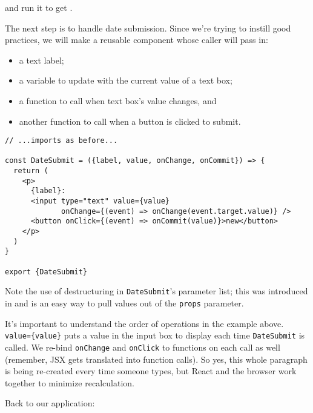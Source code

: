 \noindent
and run it to get .


The next step is to handle date submission.
Since we're trying to instill good practices,
we will make a reusable component whose caller will pass in:

\begin{itemize}
\item
  a text label;
\item
  a variable to update with the current value of a text box;
\item
  a function to call when text box's value changes, and
\item
  another function to call when a button is clicked to submit.
\end{itemize}

\begin{verbatim}
// ...imports as before...

const DateSubmit = ({label, value, onChange, onCommit}) => {
  return (
    <p>
      {label}:
      <input type="text" value={value}
             onChange={(event) => onChange(event.target.value)} />
      <button onClick={(event) => onCommit(value)}>new</button>
    </p>
  )
}

export {DateSubmit}
\end{verbatim}

Note the use of destructuring in \texttt{DateSubmit}'s parameter list;
this was introduced in 
and is an easy way to pull values out of the \texttt{props} parameter.

It's important to understand the order of operations in the example above.
\texttt{value=\{value\}} puts a value in the input box to display each time \texttt{DateSubmit} is called.
We re-bind \texttt{onChange} and \texttt{onClick} to functions on each call as well
(remember, JSX gets translated into function calls).
So yes,
this whole paragraph is being re-created every time someone types,
but React and the browser work together to minimize recalculation.

Back to our application:

